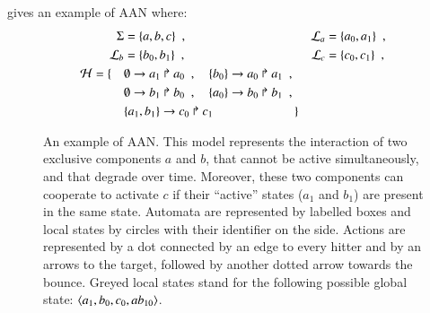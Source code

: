\begin{example}
   gives an example of AAN where:
  \begin{align*}
    \Sigma &= \{ a, b, c \} \enspace,
      & \mathcal{L}_a &= \{ a_0, a_1 \} \enspace, \\
    \mathcal{L}_b &= \{ b_0, b_1 \} \enspace,
      & \mathcal{L}_c &= \{ c_0, c_1 \} \enspace, \\
    \mathcal{H} = \{ \quad
      & \emptyset\rightarrow a_1\Rsh a_0 \enspace , \quad
        \{b_0\}\rightarrow a_0\Rsh a_1 \enspace , \\
      & \emptyset\rightarrow b_1\Rsh b_0 \enspace , \quad
        \{a_0\}\rightarrow b_0\Rsh b_1 \enspace , \\
      & \{a_1, b_1\}\rightarrow c_0\Rsh c_1 \enspace \quad \qquad \qquad
      \quad \}
  \end{align*}

\begin{figure}[tb]
  \centering
  \caption{%
  \label{fig:ph-livelock}%
    An example of AAN.
    This model represents the interaction of two exclusive components $a$ and $b$,
    that cannot be active simultaneously, and that degrade over time.
    Moreover, these two components can cooperate to activate $c$
    if their “active” states ($a_1$ and $b_1$)
    are present in the same state.
    Automata are represented by labelled boxes
    and local states by circles with their identifier on the side.
    Actions are represented by a dot connected by an edge to every hitter
    and by an arrows to the target, followed by another dotted arrow towards the bounce.
    Greyed local states stand for the following possible global state:
    $\mbox{$\langle a_1, b_0, c_0, ab_{10} \rangle$}$.
  }
\end{figure}

\end{example}

